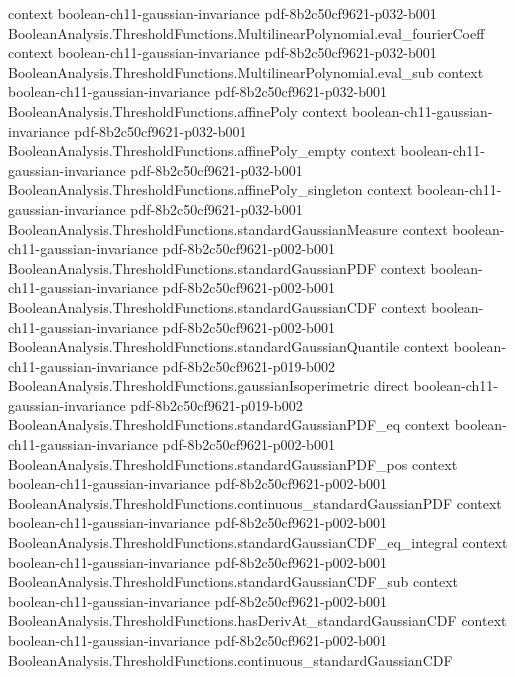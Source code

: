 \begin{theorem}
  {context}
  {boolean-ch11-gaussian-invariance}
  {pdf-8b2c50cf9621-p032-b001}
\proofstep
  {BooleanAnalysis.ThresholdFunctions.MultilinearPolynomial.eval_fourierCoeff}
  {context}
  {boolean-ch11-gaussian-invariance}
  {pdf-8b2c50cf9621-p032-b001}
\proofstep
  {BooleanAnalysis.ThresholdFunctions.MultilinearPolynomial.eval_sub}
  {context}
  {boolean-ch11-gaussian-invariance}
  {pdf-8b2c50cf9621-p032-b001}
\proofstep
  {BooleanAnalysis.ThresholdFunctions.affinePoly}
  {context}
  {boolean-ch11-gaussian-invariance}
  {pdf-8b2c50cf9621-p032-b001}
\proofstep
  {BooleanAnalysis.ThresholdFunctions.affinePoly_empty}
  {context}
  {boolean-ch11-gaussian-invariance}
  {pdf-8b2c50cf9621-p032-b001}
\proofstep
  {BooleanAnalysis.ThresholdFunctions.affinePoly_singleton}
  {context}
  {boolean-ch11-gaussian-invariance}
  {pdf-8b2c50cf9621-p032-b001}
\proofstep
  {BooleanAnalysis.ThresholdFunctions.standardGaussianMeasure}
  {context}
  {boolean-ch11-gaussian-invariance}
  {pdf-8b2c50cf9621-p002-b001}
\proofstep
  {BooleanAnalysis.ThresholdFunctions.standardGaussianPDF}
  {context}
  {boolean-ch11-gaussian-invariance}
  {pdf-8b2c50cf9621-p002-b001}
\proofstep
  {BooleanAnalysis.ThresholdFunctions.standardGaussianCDF}
  {context}
  {boolean-ch11-gaussian-invariance}
  {pdf-8b2c50cf9621-p002-b001}
\proofstep
  {BooleanAnalysis.ThresholdFunctions.standardGaussianQuantile}
  {context}
  {boolean-ch11-gaussian-invariance}
  {pdf-8b2c50cf9621-p019-b002}
\proofstep
  {BooleanAnalysis.ThresholdFunctions.gaussianIsoperimetric}
  {direct}
  {boolean-ch11-gaussian-invariance}
  {pdf-8b2c50cf9621-p019-b002}
\proofstep
  {BooleanAnalysis.ThresholdFunctions.standardGaussianPDF_eq}
  {context}
  {boolean-ch11-gaussian-invariance}
  {pdf-8b2c50cf9621-p002-b001}
\proofstep
  {BooleanAnalysis.ThresholdFunctions.standardGaussianPDF_pos}
  {context}
  {boolean-ch11-gaussian-invariance}
  {pdf-8b2c50cf9621-p002-b001}
\proofstep
  {BooleanAnalysis.ThresholdFunctions.continuous_standardGaussianPDF}
  {context}
  {boolean-ch11-gaussian-invariance}
  {pdf-8b2c50cf9621-p002-b001}
\proofstep
  {BooleanAnalysis.ThresholdFunctions.standardGaussianCDF_eq_integral}
  {context}
  {boolean-ch11-gaussian-invariance}
  {pdf-8b2c50cf9621-p002-b001}
\proofstep
  {BooleanAnalysis.ThresholdFunctions.standardGaussianCDF_sub}
  {context}
  {boolean-ch11-gaussian-invariance}
  {pdf-8b2c50cf9621-p002-b001}
\proofstep
  {BooleanAnalysis.ThresholdFunctions.hasDerivAt_standardGaussianCDF}
  {context}
  {boolean-ch11-gaussian-invariance}
  {pdf-8b2c50cf9621-p002-b001}
\proofstep
  {BooleanAnalysis.ThresholdFunctions.continuous_standardGaussianCDF}

\end{theorem}
